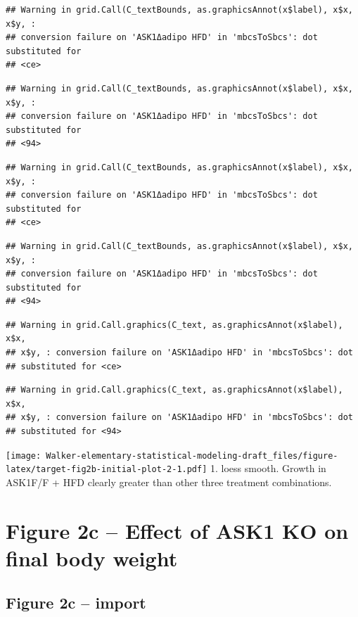 \documentclass[]{book}
\begin{document}
\begin{verbatim}
## Warning in grid.Call(C_textBounds, as.graphicsAnnot(x$label), x$x, x$y, :
## conversion failure on 'ASK1Δadipo HFD' in 'mbcsToSbcs': dot substituted for
## <ce>
\end{verbatim}

\begin{verbatim}
## Warning in grid.Call(C_textBounds, as.graphicsAnnot(x$label), x$x, x$y, :
## conversion failure on 'ASK1Δadipo HFD' in 'mbcsToSbcs': dot substituted for
## <94>
\end{verbatim}

\begin{verbatim}
## Warning in grid.Call(C_textBounds, as.graphicsAnnot(x$label), x$x, x$y, :
## conversion failure on 'ASK1Δadipo HFD' in 'mbcsToSbcs': dot substituted for
## <ce>
\end{verbatim}

\begin{verbatim}
## Warning in grid.Call(C_textBounds, as.graphicsAnnot(x$label), x$x, x$y, :
## conversion failure on 'ASK1Δadipo HFD' in 'mbcsToSbcs': dot substituted for
## <94>
\end{verbatim}

\begin{verbatim}
## Warning in grid.Call.graphics(C_text, as.graphicsAnnot(x$label), x$x,
## x$y, : conversion failure on 'ASK1Δadipo HFD' in 'mbcsToSbcs': dot
## substituted for <ce>
\end{verbatim}

\begin{verbatim}
## Warning in grid.Call.graphics(C_text, as.graphicsAnnot(x$label), x$x,
## x$y, : conversion failure on 'ASK1Δadipo HFD' in 'mbcsToSbcs': dot
## substituted for <94>
\end{verbatim}

\texttt{[image: Walker-elementary-statistical-modeling-draft\_files/figure-latex/target-fig2b-initial-plot-2-1.pdf]}
1. loess smooth. Growth in ASK1F/F + HFD clearly greater than other three treatment combinations.

\hypertarget{figure-2c-effect-of-ask1-ko-on-final-body-weight}{%
\section{Figure 2c -- Effect of ASK1 KO on final body weight}\label{figure-2c-effect-of-ask1-ko-on-final-body-weight}}

\hypertarget{figure-2c-import}{%
\subsection{Figure 2c -- import}\label{figure-2c-import}}
\end{document}
